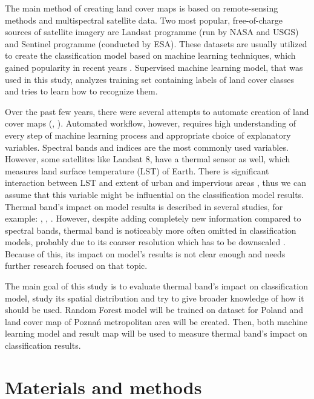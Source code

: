 \documentclass{amuthesis}
\begin{document}
The main method of creating land cover maps is based on remote-sensing
methods and multispectral satellite data. Two most popular,
free-of-charge sources of satellite imagery are Landsat programme (run
by NASA and USGS) and Sentinel programme (conducted by ESA). These
datasets are usually utilized to create the classification model based
on machine learning techniques, which gained popularity in recent years
\autocite{maxwell_implementation_2018}. Supervised machine learning
model, that was used in this study, analyzes training set containing
labels of land cover classes and tries to learn how to recognize them.

Over the past few years, there were several attempts to automate
creation of land cover maps (\textcite{malinowski_automated_2020},
\textcite{witjes_spatiotemporal_2021}). Automated workflow, however,
requires high understanding of every step of machine learning process
and appropriate choice of explanatory variables. Spectral bands and
indices are the most commonly used variables. However, some satellites
like Landsat 8, have a thermal sensor as well, which measures land
surface temperature (LST) of Earth. There is significant interaction
between LST and extent of urban and impervious areas
\autocite{dutta_changing_2019}, thus we can assume that this variable
might be influential on the classification model results. Thermal band's
impact on model results is described in several studies, for example:
\textcite{rodriguez-galiano_incorporating_2012},
\textcite{zhao_exploring_2019}, \textcite{sun_improvement_2015}.
However, despite adding completely new information compared to spectral
bands, thermal band is noticeably more often omitted in classification
models, probably due to its coarser resolution which has to be
downscaled \autocite{rodriguez-galiano_incorporating_2012}. Because of
this, its impact on model's results is not clear enough and needs
further research focused on that topic.

The main goal of this study is to evaluate thermal band's impact on
classification model, study its spatial distribution and try to give
broader knowledge of how it should be used. Random Forest model will be
trained on dataset for Poland and land cover map of Poznań metropolitan
area will be created. Then, both machine learning model and result map
will be used to measure thermal band's impact on classification results.


\hypertarget{sec-data-methods}{%
\chapter{Materials and methods}\label{sec-data-methods}}
\end{document}
